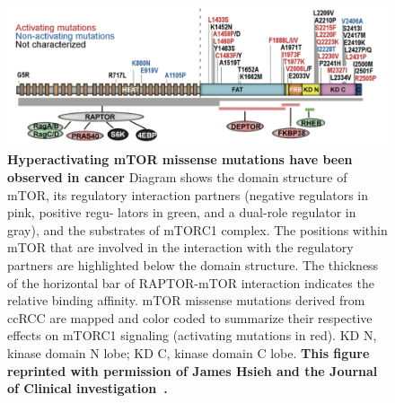 \documentclass[phd,tocprelim]{cornell}
\begin{document}
\begin{landscape}
	\begin{figure}[p]
		\centering
		\includegraphics[width=1.0\linewidth]{figures/mtor-fig3.png}
		\caption[Hyperactivating mTOR missense mutations have been observed in cancer]{
			{\bf Hyperactivating mTOR missense mutations have been observed in cancer}
			Diagram shows the domain structure of mTOR, its regulatory interaction partners (negative regulators in pink, positive regu- lators in green, and a dual-role regulator in gray), and the substrates of mTORC1 complex. The positions within mTOR that are involved in the interaction with the regulatory partners are highlighted below the domain structure. The thickness of the horizontal bar of RAPTOR-mTOR interaction indicates the relative binding affinity. mTOR missense mutations derived from ccRCC are mapped and color coded
			to summarize their respective effects on mTORC1 signaling (activating mutations in red). KD N, kinase domain N lobe; KD C, kinase domain C lobe. \bf{This figure reprinted with permission of James Hsieh and the Journal of Clinical investigation~\citep{Xu:2016fw}.}
		}
		\label{fig:mtor-figure3}
	\end{figure}
\end{landscape}
\end{document}
